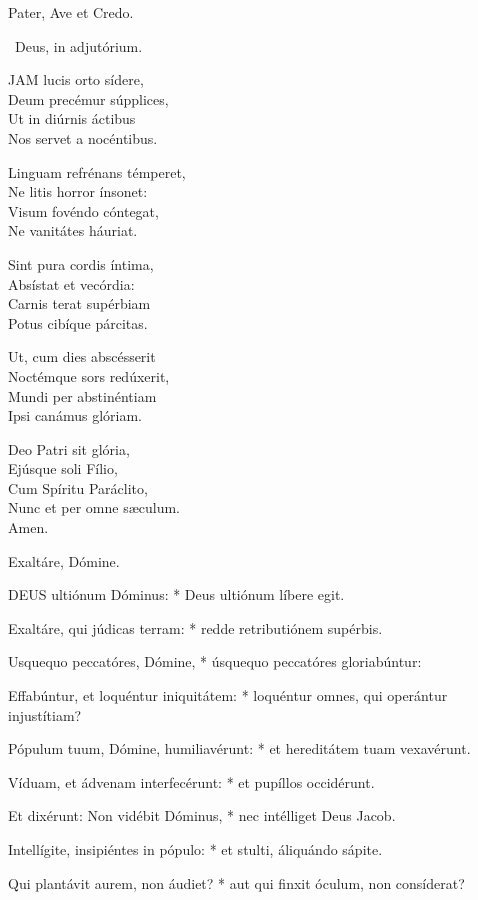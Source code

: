 Pater, Ave et Credo.

\V\ Deus, in adjutórium.


\lettrine[lines=2]{J}{AM} lucis orto sídere,\\
Deum precémur súpplices,\\
Ut in diúrnis áctibus\\
Nos servet a nocéntibus.

Linguam refrénans témperet,\\
Ne litis horror ínsonet:\\
Visum fovéndo cóntegat,\\
Ne vanitátes háuriat.

Sint pura cordis íntima,\\
Absístat et vecórdia:\\
Carnis terat supérbiam\\
Potus cibíque párcitas.

Ut, cum dies abscésserit\\
Noctémque sors redúxerit,\\
Mundi per abstinéntiam\\
Ipsi canámus glóriam.

Deo Patri sit glória,\\
Ejúsque soli Fílio,\\
Cum Spíritu Paráclito,\\
Nunc et per omne sæculum.\\
Amen.

 Exaltáre, Dómine.


\lettrine[lines=2]{D}{EUS} ultiónum Dóminus: * Deus ultiónum líbere egit.

Exaltáre, qui júdicas terram: * redde retributiónem supérbis.

Usquequo peccatóres, Dómine, * úsquequo peccatóres gloriabúntur:

Effabúntur, et loquéntur iniquitátem: * loquéntur omnes, qui operántur injustítiam?

Pópulum tuum, Dómine, humiliavérunt: * et hereditátem tuam vexavérunt.

Víduam, et ádvenam interfecérunt: * et pupíllos occidérunt.

Et dixérunt: Non vidébit Dóminus, * nec intélliget Deus Jacob.

Intellígite, insipiéntes in pópulo: * et stulti, áliquándo sápite.

Qui plantávit aurem, non áudiet? * aut qui finxit óculum, non consíderat?

